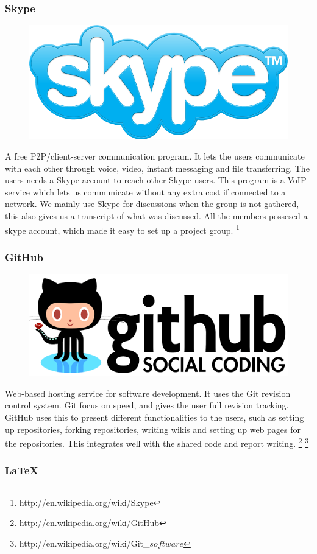 \subsubsection{Skype}

\begin{figure}
\vspace{-30pt}
\centering
\includegraphics[width = .20\textwidth]{image/skype-logo.png}
\end{figure}

A free P2P/client-server communication program. It lets the users communicate with each other through voice, video, instant messaging and file transferring. The users needs a Skype account to reach other Skype users. This program is a VoIP service which lets us communicate without any extra cost if connected to a network. We mainly use Skype for discussions when the group is not gathered, this also gives us a transcript of what was discussed. All the members possesed a skype account, which made it easy to set up a project group.
\footnote{http://en.wikipedia.org/wiki/Skype}

\subsubsection{GitHub} \label{GitHub}

\begin{figure}
\vspace{-30pt}
\centering
\includegraphics[width = .20\textwidth]{image/github-logo.png}
\end{figure}

Web-based hosting service for software development. It uses the Git revision control system. Git focus on speed, and gives the user full revision tracking. GitHub uses this to present different functionalities to the users, such as setting up repositories, forking repositories, writing wikis and setting up web pages for the repositories. This integrates well with the shared code and report writing.
\footnote{http://en.wikipedia.org/wiki/GitHub}
\footnote{http://en.wikipedia.org/wiki/Git\_\(software\)}

\subsubsection{LaTeX}

